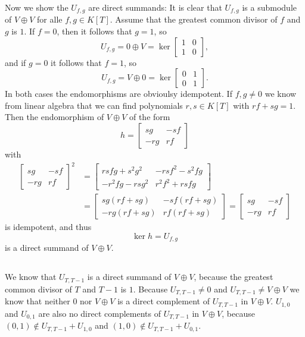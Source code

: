 \documentclass[a4paper,10pt]{article}
\theoremstyle{definition}
\newcommand{\bvect}[1]{\begin{bmatrix}#1\end{bmatrix}}
\begin{document}
Now we show the $U_{f,g}$ are direct summands: It is clear that $U_{f,g}$ is a submodule of $V \oplus V$ for alle $f,g \in K[T]$. Assume that the greatest common divisor of $f$ and $g$ is $1$. If $f=0$, then it follows that $g=1$, so
\[
 U_{f,g} = 0 \oplus V = \ker \bvect{1&0\\1&0},
\]
and if $g=0$ it follows that $f=1$, so
\[
 U_{f,g} = V \oplus 0 = \ker \bvect{0&1\\0&1}.
\]
In both cases the endomorphisms are obvioulsy idempotent.
If $f,g \neq 0$ we know from linear algebra that we can find polynomials $r,s\in K[T]$ with $rf + sg = 1$. Then the endomorphism of $V \oplus V$ of the form
\[
 h = 
 \begin{bmatrix}
   sg & -sf \\
  -rg &  rf
 \end{bmatrix}
\]
with
\begin{align*}
 \begin{bmatrix}
   sg & -sf \\
  -rg &  rf
 \end{bmatrix}^2
 &=
 \begin{bmatrix}
  rsfg + s^2g^2 & -rsf^2-s^2fg \\
 -r^2fg - rsg^2 & r^2 f^2 + rsfg
 \end{bmatrix} \\
 &=
 \begin{bmatrix}
  sg(rf+sg) & -sf(rf+sg) \\
 -rg(rf+sg) & rf(rf+sg)
 \end{bmatrix}
 =
 \begin{bmatrix}
   sg & -sf \\
  -rg &  rf
 \end{bmatrix}
\end{align*}
is idempotent, and thus
\[
 \ker h = U_{f,g}
\]
is a direct summand of $V \oplus V$.


\subsection{}
We know that $U_{T,T-1}$ is a direct summand of $V \oplus V$, because the greatest common divisor of $T$ and $T-1$ is $1$. Because $U_{T,T-1} \neq 0$ and $U_{T,T-1} \neq V \oplus V$ we know that neither $0$ nor $V \oplus V$ is a direct complement of $U_{T,T-1}$ in $V \oplus V$. $U_{1,0}$ and $U_{0,1}$ are also no direct complements of $U_{T,T-1}$ in $V \oplus V$, because $(0,1) \not\in U_{T,T-1} + U_{1,0}$ and $(1,0) \not\in U_{T,T-1} + U_{0,1}$.
\end{document}
